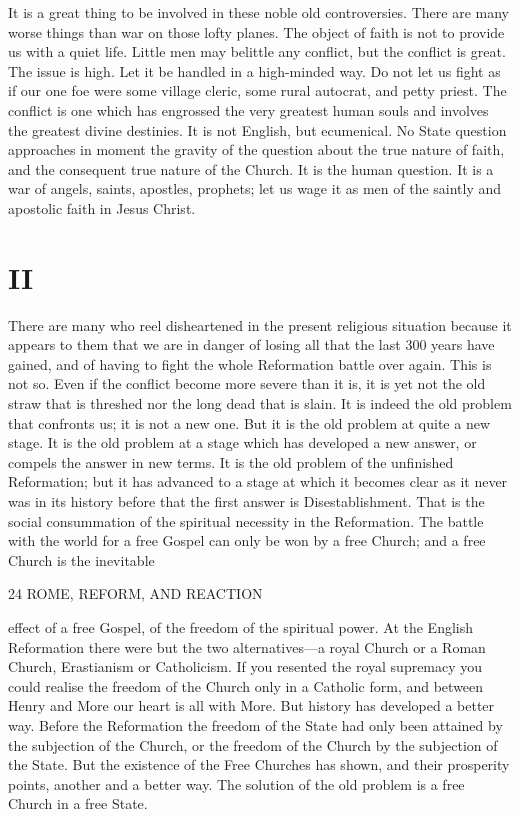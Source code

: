 \documentclass[12pt,a5paper,oneside]{book}
\begin{document}
It is a great thing to be involved in these noble 
old controversies. There are many worse things 
than war on those lofty planes. The object of faith 
is not to provide us with a quiet life. Little men 
may belittle any conflict, but the conflict is great. 
The issue is high. Let it be handled in a high-minded 
way. Do not let us fight as if our one foe 
were some village cleric, some rural autocrat, and 
petty priest. The conflict is one which has engrossed 
the very greatest human souls and involves the 
greatest divine destinies. It is not English, but 
ecumenical. No State question approaches in 
moment the gravity of the question about the true 
nature of faith, and the consequent true nature of the 
Church. It is the human question. It is a war of 
angels, saints, apostles, prophets; let us wage it as 
men of the saintly and apostolic faith in Jesus Christ. 

\section*{II}

There are many who reel disheartened in the present 
religious situation because it appears to them that we 
are in danger of losing all that the last 300 years 
have gained, and of having to fight the whole 
Reformation battle over again. This is not so. 
Even if the conflict become more severe than it is, 
it is yet not the old straw that is threshed nor the 
long dead that is slain. It is indeed the old problem 
that confronts us; it is not a new one. But it is 
the old problem at quite a new stage. It is the old 
problem at a stage which has developed a new answer, 
or compels the answer in new terms. It is the old 
problem of the unfinished Reformation; but it has 
advanced to a stage at which it becomes clear as it 
never was in its history before that the first answer is 
Disestablishment. That is the social consummation of 
the spiritual necessity in the Reformation. The battle 
with the world for a free Gospel can only be won by 
a free Church; and a free Church is the inevitable 



24 ROME, REFORM, AND REACTION 

effect of a free Gospel, of the freedom of the spiritual 
power. At the English Reformation there were but 
the two alternatives---a royal Church or a Roman 
Church, Erastianism or Catholicism. If you resented 
the royal supremacy you could realise the freedom of 
the Church only in a Catholic form, and between 
Henry and More our heart is all with More. But 
history has developed a better way. Before the 
Reformation the freedom of the State had only been 
attained by the subjection of the Church, or the 
freedom of the Church by the subjection of the State. 
But the existence of the Free Churches has shown, 
and their prosperity points, another and a better way. 
The solution of the old problem is a free Church in 
a free State. 
\end{document}
